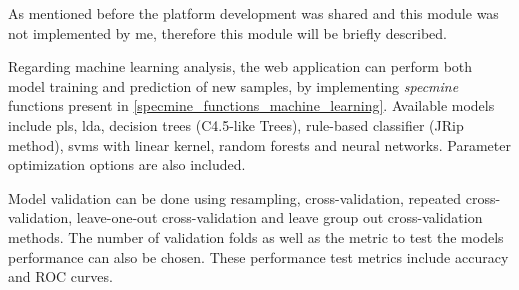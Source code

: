 As mentioned before the platform development was shared and this module was not implemented by me, therefore this module will be briefly described.

Regarding machine learning analysis, the web application can perform both model training and prediction of new samples, by implementing \textit{specmine} functions present in \autoref{specmine_functions_machine_learning}. Available models include \gls{pls}, \gls{lda}, decision trees (C4.5-like Trees), rule-based classifier (JRip method), \gls{svm}s with linear kernel, random forests and neural networks. Parameter optimization options are also included. 


Model validation can be done using resampling, cross-validation, repeated cross-validation, leave-one-out cross-validation and leave group out cross-validation methods. The number of validation folds as well as the metric to test the models performance can also be chosen. These performance test metrics include accuracy and ROC curves.

%

